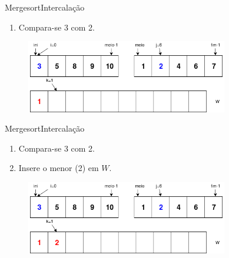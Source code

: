 \documentclass[aspectratio=169]{beamer}
\begin{document}
\begin{frame}{Mergesort}{Intercalação}
\begin{enumerate}
 \item Compara-se 3 com 2.
\end{enumerate}

\begin{figure}[!h]
  \centering
  \includegraphics[width=250pt]{imgs/merge/merge2.png}
  \label{fig_merge2}
\end{figure}
\end{frame}


\begin{frame}{Mergesort}{Intercalação}
\begin{enumerate}
 \item Compara-se 3 com 2.
 \item Insere o menor (2) em $W$.
\end{enumerate}

\begin{figure}[!h]
  \centering
  \includegraphics[width=250pt]{imgs/merge/merge2_1.png}
  \label{fig_merge2_1}
\end{figure}
\end{frame}

\end{document}
